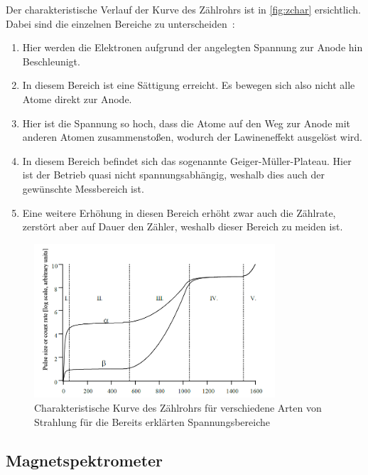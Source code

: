 \documentclass[12pt,english,ngerman]{scrartcl}
\begin{document}
Der charakteristische Verlauf der Kurve des Zählrohrs ist in
\autoref{fig:zchar} ersichtlich. Dabei sind die einzelnen Bereiche zu
unterscheiden~\cite[]{gerthsen}:

\begin{enumerate}[label = \Roman*.]
	\item Hier werden die Elektronen aufgrund der angelegten Spannung zur Anode hin
	      Beschleunigt.
	\item In diesem Bereich ist eine Sättigung erreicht. Es bewegen sich also nicht alle
	      Atome direkt zur Anode.
	\item Hier ist die Spannung so hoch, dass die Atome auf den Weg zur Anode mit anderen
	      Atomen zusammenstoßen, wodurch der Lawineneffekt ausgelöst wird.
	\item In diesem Bereich befindet sich das sogenannte Geiger-Müller-Plateau. Hier ist
	      der Betrieb quasi nicht spannungsabhängig, weshalb dies auch der gewünschte
	      Messbereich ist.
	\item Eine weitere Erhöhung in diesen Bereich erhöht zwar auch die Zählrate, zerstört
	      aber auf Dauer den Zähler, weshalb dieser Bereich zu meiden ist.
\end{enumerate}

\begin{figure}[H]
	\centering
	\includegraphics[width = 0.8\textwidth]{./figures/zcharakteristik.png}
	\caption{Charakteristische Kurve des Zählrohrs
		für verschiedene Arten von Strahlung für die
		Bereits erklärten Spannungsbereiche~\cite[]{zaehlrohrvorbereitung}}\label{fig:zchar}
\end{figure}

\subsection{Magnetspektrometer}
\end{document}
